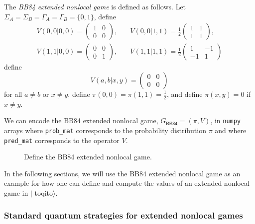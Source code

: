 \documentclass[nofootinbib,superscriptaddress,a4paper,twocolumn,longbibliography,floatfix,pra]{revtex4-2}
\newcommand{\toqitofont}{%
	\fontfamily{FiraSans}%
	\selectfont}
\newcommand{\toqito}{ $|${\toqitofont toqito}$\rangle$\xspace}
\newcommand{\numpy}{\texttt{numpy}\xspace}
\def\BB84{\mathsf{BB84}}
\begin{document}
The \emph{BB84 extended nonlocal game} is defined as follows. Let $\Sigma_A =
\Sigma_B = \Gamma_A = \Gamma_B = \{0,1\}$, define
\begin{equation}
    \begin{aligned}
        V(0,0|0,0) = 
        \begin{pmatrix} 1 & 0 \\ 0 & 0 \end{pmatrix}, &\quad
        V(0,0|1,1) = 
        \frac{1}{2} \begin{pmatrix} 1 & 1 \\ 1 & 1 \end{pmatrix}, \\
        V(1,1|0,0) = 
        \begin{pmatrix} 0 & 0 \\ 0 & 1 \end{pmatrix}, &\quad
        V(1,1|1,1) = 
        \frac{1}{2} \begin{pmatrix} 1 & -1 \\ -1 & 1\end{pmatrix}
    \end{aligned}
\end{equation}
define
\begin{equation}
    V(a,b|x,y) = \begin{pmatrix} 0 & 0 \\ 0 & 0 \end{pmatrix}
\end{equation}
for all $a \not= b$ or $x \not= y$, define $\pi(0, 0) = \pi(1, 1) =
\frac{1}{2}$, and define $\pi(x,y) = 0$ if $x \not= y$.

We can encode the BB84 extended nonlocal game, $G_{\BB84} = (\pi, V)$, in
\numpy arrays where \texttt{prob\_mat} corresponds to the probability
distribution $\pi$ and where \texttt{pred\_mat} corresponds to the operator
$V$.

\begin{figure}[!htpb]
    \centering
            
    \caption{Define the BB84 extended nonlocal game.}
    \label{fig:bb84_game}
\end{figure}

In the following sections, we will use the BB84 extended nonlocal game as an
example for how one can define and compute the values of an extended nonlocal
game in \toqito.

\subsubsection{Standard quantum strategies for extended nonlocal games}
\label{sec:standard_quantum_strategies_for_extended_nonlocal_games}
\end{document}
